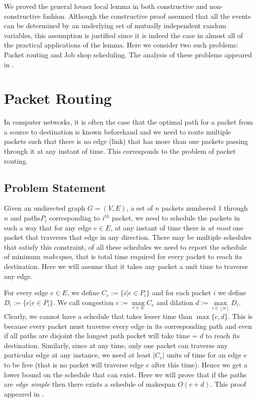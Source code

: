 We proved the general lovasz local lemma in both constructive and non-constructive fashion. Although the constructive proof assumed that all the events can be determined by an underlying set of mutually independent random variables, 
this assumption is justified since it is indeed the case in almost all of the practical applications of the lemma. Here we consider two such problems: Packet routing and Job shop scheduling. The analysis of these problems appeared in \cite{srinivasan}.

\section{Packet Routing}
In computer networks, it is often the case that the optimal path for a packet from a source to destination is known beforehand and we need to route multiple packets such that there is no edge (link) that has more than one packets passing through it at any instant of time. This corresponds to the problem of packet routing.

\subsection{Problem Statement}
Given an undirected graph $G=(V,E) $, a set of $n$ packets numbered 1 through $n$ and paths$P_i$ corresponding to $i^{th}$ packet, we need to schedule the packets in such a way that for any edge $e\in E $, at any instant of time there is \emph{at most} one packet that traverses that edge in any direction. There may be multiple schedules that satisfy this constraint, of all these schedules we need to report the schedule of minimum \emph{makespan}, that is total time required for every packet to reach its destination. Here we will assume that it takes any packet a unit time to traverse any edge.

For every edge $e\in E$, we define 
$C_e := \{i| e\in P_i \} $ and for each packet $i$ we define $D_i:=\{e|e\in P_i \} $. We call congestion $c:=\max\limits_{e\in E}C_e $ and dilation $d:=\max\limits_{i\in[n]}D_i $. Clearly, we cannot have a schedule that takes lesser time than $\max\{c,d\} $. This is because every packet must traverse every edge in its corresponding path and even if all paths are disjoint the longest path packet will take time = $d$ to reach its destination. Similarly, since at any time, only one packet can traverse any particular edge at any instance, we need at least $|C_e| $ units of time for an edge $e$ to be free (that is no packet will traverse edge $e$ after this time). Hence we get a lower bound on the schedule that can exist. Here we will prove that if the paths are \emph{edge simple} then there exists a schedule of makespan $O(c+d)$. This proof appeared in \cite{jobshop}. 

